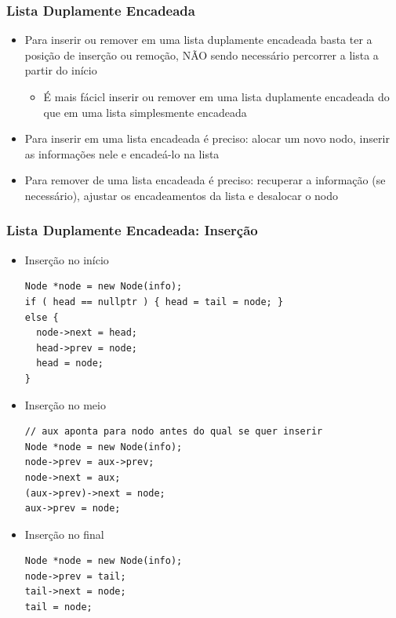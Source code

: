 \documentclass[aspectratio=169]{beamer}
\begin{document}
\begin{frame}[fragile]\frametitle{Lista Duplamente Encadeada}
\begin{itemize}
	\item Para inserir ou remover em uma lista duplamente encadeada basta ter a posição de inserção ou remoção, NÃO sendo necessário percorrer a lista a partir do início
	\begin{itemize}
		\item É mais fácicl inserir ou remover em uma lista duplamente encadeada do que em uma lista simplesmente encadeada
	\end{itemize}
	\item Para inserir em uma lista encadeada é preciso: alocar um novo nodo, inserir as informações nele e encadeá-lo na lista
	\item Para remover de uma lista encadeada é preciso: recuperar a informação (se necessário), ajustar os encadeamentos da lista e desalocar o nodo
\end{itemize}
\end{frame}

\begin{frame}[fragile]\frametitle{Lista Duplamente Encadeada: Inserção}
\begin{itemize}
	\item Inserção no início
\begin{lstlisting}[basicstyle=\ttfamily\tiny]
Node *node = new Node(info);
if ( head == nullptr ) { head = tail = node; }
else {
  node->next = head;
  head->prev = node;
  head = node;
}
\end{lstlisting}
	\item Inserção no meio
\begin{lstlisting}[basicstyle=\ttfamily\tiny]
// aux aponta para nodo antes do qual se quer inserir
Node *node = new Node(info);
node->prev = aux->prev;
node->next = aux;
(aux->prev)->next = node;
aux->prev = node;
\end{lstlisting}
	\item Inserção no final
\begin{lstlisting}[basicstyle=\ttfamily\tiny]
Node *node = new Node(info);
node->prev = tail;
tail->next = node;
tail = node;
\end{lstlisting}
\end{itemize}
\end{frame}
\end{document}
